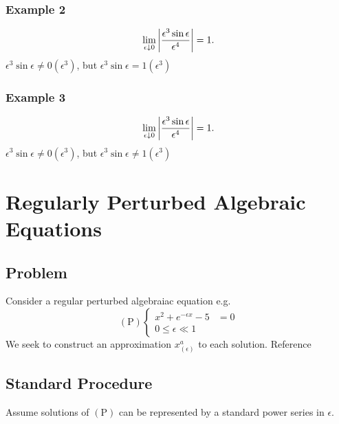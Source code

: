 \documentclass[12pt]{article}
\begin{document}
\subsubsection{Example 2}
$$\lim_{\epsilon\downarrow0}\left|{\frac{\epsilon^3\sin\epsilon}{\epsilon^4}}\right|=1.$$
$\epsilon^3\sin\epsilon\ne0(\epsilon^3)$, but $\epsilon^3\sin\epsilon=1(\epsilon^3)$
\subsubsection{Example 3}
$$\lim_{\epsilon\downarrow0}\left|{\frac{\epsilon^3\sin\epsilon}{\epsilon^4}}\right|=1.$$
$\epsilon^3\sin\epsilon\ne0(\epsilon^3)$, but $\epsilon^3\sin\epsilon\ne1(\epsilon^3)$

\section{Regularly Perturbed Algebraic Equations}
\subsection{Problem}
Consider a regular perturbed algebraiac equation e.g.
\begin{equation}
  (\text{P}) \left\{
    \begin{aligned}
      x^2+e^{-\epsilon x} - 5 &= 0\\
      0 \le \epsilon \ll 1
    \end{aligned}
  \right.
\end{equation}
We seek to construct an approximation $x^{a}_{(\epsilon)}$ to each solution.
Reference 
\subsection{Standard Procedure}
Assume solutions of $(\text{P})$ can be represented by a standard power series
in $\epsilon$.
\end{document}
